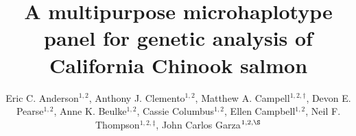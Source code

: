 

\newcommand{\myTitle}{A multipurpose microhaplotype panel for genetic analysis of California Chinook salmon}
\title{\myTitle}

\newcommand{\myAuthors}{Eric C. Anderson$^{1,\S}$, Anthony J. Clemento$^{1,2}$, Matthew A. Campell$^{1,2\dagger}$, Devon E. Pearse$^{1,2}$, Anne K. Beulke$^{1,2}$, Cassie Columbus$^{1,2}$, Ellen Campbell$^{1,2}$, Neil F. Thompson$^{1,2\ddag}$, John Carlos Garza$^{1,2,\S}$}
\author{Eric C. Anderson$^{1,2}$, Anthony J. Clemento$^{1,2}$, Matthew A. Campell$^{1,2,\dagger}$, Devon E. Pearse$^{1,2}$, Anne K. Beulke$^{1,2}$, Cassie Columbus$^{1,2}$, Ellen Campbell$^{1,2}$, Neil F. Thompson$^{1,2,\ddag}$, John Carlos Garza$^{1,2,\S}$}


\newcommand{\myAffiliations}{
$^1$Southwest Fisheries Science Center, National Marine Fisheries Service, NOAA, Santa Cruz, California, USA. $^2$Institute for Marine Sciences, University of California, Santa Cruz, USA. $^\dagger$Current address: Centre for Carbon, Water and Food, The University of Sydney, 380 Werombi Road, NSW 2570, Australia. $^\ddag$Current address: Pacific Shellfish Research Unit, Agricultural Research Service, US Department of Agriculture, Newport, Oregon, USA.
}

\renewcommand{\AuthorAddresses}{\myAffiliations}

\renewcommand{\KeyWords}{Genetic stock identfication, population assignment, parentage based tagging, amplicon sequencing}

\renewcommand{\CorrespondingAuthor}{eric.anderson@noaa.gov,~carlos.garza@noaa.gov}


\newcommand{\myEmailAddress}{eric.anderson@noaa.gov,~carlos.garza@noaa.gov}
\newcommand{\myEmailFootnote}{$^\S$}

\newcommand{\myCopyright}{\copyright US Federal Government work in the public domain in the USA}

\newcommand{\myRunningTitle}{Microhaplotypes for California Chinook salmon}
\renewcommand{\RunningTitle}{\myRunningTitle}

\newcommand{\myRunningAuthor}{Anderson et al.}

